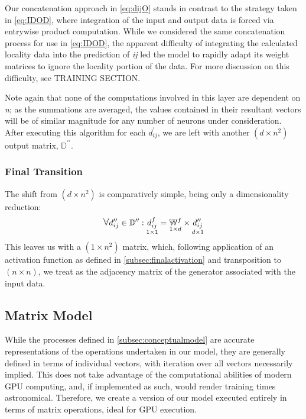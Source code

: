 Our concatenation approach in \eqref{eq:dijO} stands in contrast to the strategy 
taken in \eqref{eq:IDOD}, where integration of the input and output data is 
forced via entrywise product computation. While we considered the same 
concatenation process for use in \eqref{eq:IDOD}, the apparent difficulty of 
integrating the calculated locality data into the prediction of \textit{ij} led 
the model to rapidly adapt its weight matrices to ignore the locality portion of 
the data.  For more discussion on this difficulty, see TRAINING SECTION.

Note again that none of the computations involved in this layer are dependent on 
\textit{n}; as the summations are averaged, the values contained in their 
resultant vectors will be of similar magnitude for any number of neurons under 
consideration. After executing this algorithm for each $d_{ij}^{\prime}$, we are 
left with another $(d \times n^2)$ output matrix, $\mathbb{D}^{\prime\prime}$.

\subsubsection{Final Transition}
The shift from $(d \times n^2)$ is comparatively simple, being only a 
dimensionality reduction:
\begin{equation}
	\mathlarger\forall d_{ij}^{\prime\prime} \in \mathbb{D}^{\prime\prime}:
	\underset{1 \times 1}{d_{ij}^f} = \underset{1 \times d}{\mathbb{W}^f} \times 
	\underset{d \times 1}{d_{ij}^{\prime\prime}}
\end{equation}
This leaves us with a $(1 \times n^2)$ matrix, which, following application of 
an activation function as defined in \ref{subsec:finalactivation} and 
transposition to $(n \times n)$, we treat as the adjacency matrix of the 
generator associated with the input data.

\subsection{Matrix Model}
\label{subsec:matmodel}
While the processes defined in \ref{subsec:conceptualmodel} are accurate 
representations of the operations undertaken in our model, they are generally 
defined in terms of individual vectors, with iteration over all vectors 
necessarily implied. This does not take advantage of the computational abilities 
of modern GPU computing, and, if implemented as such, would render training 
times astronomical. Therefore, we create a version of our model executed 
entirely in terms of matrix operations, ideal for GPU execution.

